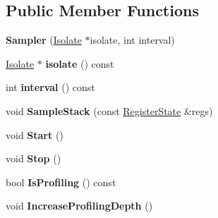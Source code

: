 \subsection*{Public Member Functions}
\begin{DoxyCompactItemize}
\item 
\hypertarget{classv8_1_1internal_1_1_sampler_a2a11e616d00bc5369d44e76113ff48bb}{}{\bfseries Sampler} (\hyperlink{classv8_1_1internal_1_1_isolate}{Isolate} $\ast$isolate, int interval)\label{classv8_1_1internal_1_1_sampler_a2a11e616d00bc5369d44e76113ff48bb}

\item 
\hypertarget{classv8_1_1internal_1_1_sampler_ac03a5a700f506b92eeec457aaa618d21}{}\hyperlink{classv8_1_1internal_1_1_isolate}{Isolate} $\ast$ {\bfseries isolate} () const \label{classv8_1_1internal_1_1_sampler_ac03a5a700f506b92eeec457aaa618d21}

\item 
\hypertarget{classv8_1_1internal_1_1_sampler_a95ac452fc3a30dff69891f742a5c9488}{}int {\bfseries interval} () const \label{classv8_1_1internal_1_1_sampler_a95ac452fc3a30dff69891f742a5c9488}

\item 
\hypertarget{classv8_1_1internal_1_1_sampler_aaed3aa542715995262c3e6989c058c05}{}void {\bfseries Sample\+Stack} (const \hyperlink{structv8_1_1internal_1_1_register_state}{Register\+State} \&regs)\label{classv8_1_1internal_1_1_sampler_aaed3aa542715995262c3e6989c058c05}

\item 
\hypertarget{classv8_1_1internal_1_1_sampler_a49677027e31c1bbe7f6bd66267b9d0db}{}void {\bfseries Start} ()\label{classv8_1_1internal_1_1_sampler_a49677027e31c1bbe7f6bd66267b9d0db}

\item 
\hypertarget{classv8_1_1internal_1_1_sampler_a2147ae394fb08970b4e8bc493bafcbc9}{}void {\bfseries Stop} ()\label{classv8_1_1internal_1_1_sampler_a2147ae394fb08970b4e8bc493bafcbc9}

\item 
\hypertarget{classv8_1_1internal_1_1_sampler_a378c62a3939febba846baaf5eee7023e}{}bool {\bfseries Is\+Profiling} () const \label{classv8_1_1internal_1_1_sampler_a378c62a3939febba846baaf5eee7023e}

\item 
\hypertarget{classv8_1_1internal_1_1_sampler_aaf362dfc4fb6f48307885325befe0763}{}void {\bfseries Increase\+Profiling\+Depth} ()\label{classv8_1_1internal_1_1_sampler_aaf362dfc4fb6f48307885325befe0763}


\end{DoxyCompactItemize}

